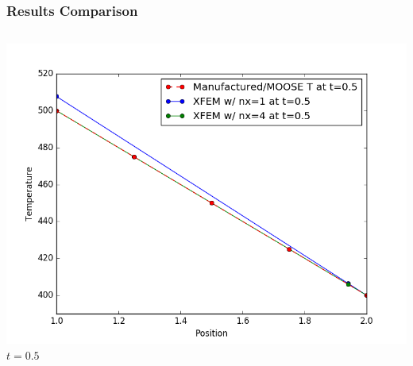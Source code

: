 \documentclass[]{beamer}
\begin{document}
\begin{frame}[t]\frametitle{Results Comparison}
  	\begin{columns}
			\begin{center}
			\includegraphics[scale=0.17]{figures/1D_rz_h1m/1D_rz_homog1mat_u_vs_x_05}\\
			$t=0.5$
			
			\null
			

\end{center}
\end{columns}
\end{frame}
\end{document}

